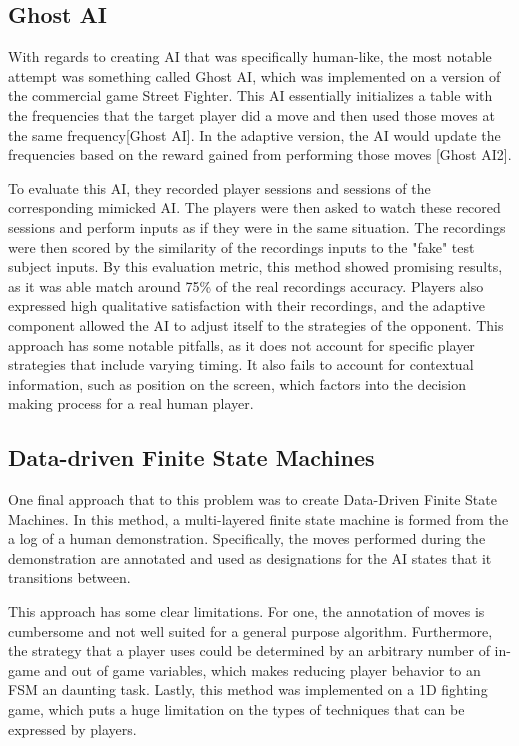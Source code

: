 \documentclass{article}
\begin{document}
\subsection{Ghost AI}
With regards to creating AI that was specifically human-like, the most notable attempt was something called Ghost AI, which was implemented on a version of the commercial game Street Fighter. This AI essentially initializes a table with the frequencies that the target player did a move and then used those moves at the same frequency[Ghost AI]. In the adaptive version, the AI would update the frequencies based on the reward gained from performing those moves [Ghost AI2]. 

To evaluate this AI, they recorded player sessions and sessions of the corresponding mimicked AI. The players were then asked to watch these recored sessions and perform inputs as if they were in the same situation. The recordings were then scored by the similarity of the recordings inputs to the "fake" test subject inputs. By this evaluation metric, this method showed promising results, as it was able match around 75\% of the real recordings accuracy. Players also expressed high qualitative satisfaction with their recordings, and the adaptive component allowed the AI to adjust itself to the strategies of the opponent. This approach has some notable pitfalls, as it does not account for specific player strategies that include varying timing. It also fails to account for contextual information, such as position on the screen, which factors into the decision making process for a real human player. 

\subsection{Data-driven Finite State Machines}
One final approach that to this problem was to create Data-Driven Finite State Machines. In this method, a multi-layered finite state machine is formed from the a log of a human demonstration. Specifically, the moves performed during the demonstration are annotated and used as designations for the AI states that it transitions between.

This approach has some clear limitations. For one, the annotation of moves is cumbersome and not well suited for a general purpose algorithm. Furthermore, the strategy that a player uses could be determined by an arbitrary number of in-game and out of game variables, which makes reducing player behavior to an FSM an daunting task. Lastly, this method was implemented on a 1D fighting game, which puts a huge limitation on the types of techniques that can be expressed by players.
\end{document}
